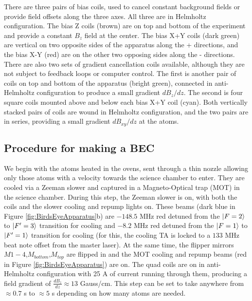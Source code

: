There are three pairs of bias coils, used to cancel constant background fields or provide field offsets along the three axes. All three are in Helmholtz configuration. The bias Z coils (brown) are on top and bottom of the experiment and provide a constant $B_z$ field at the center. The bias X+Y coils (dark green) are vertical on two opposite sides of the apparatus along the \ex{}+\ey{} directions, and the bias X-Y (red) are on the other two opposing sides along the \ex{}-\ey{} directions. There are also two sets of gradient cancellation coils available, although they are not subject to feedback loops or computer control. The first is another pair of coils on top and bottom of the apparatus (bright green), connected in anti-Helmholtz configuration to produce a small gradient $dB_z/dz$. The second is four square coils mounted above and below each bias X+Y coil (cyan). Both vertically stacked pairs of coils are wound in Helmholtz configuration, and the two pairs are in series, providing a small gradient $dB_{xy}/dz$ at the atoms.  


\subsection{Procedure for making a BEC}\label{sec:BECsequence}

We begin with the atoms heated in the ovens, sent through a thin nozzle allowing only those atoms with a velocity towards the science chamber to enter. They are cooled via a Zeeman slower and captured in a Magneto-Optical trap (MOT) in the science chamber. During this step, the Zeeman slower is on, with both the coils and the slower cooling and repump lights on. These beams (dark blue in Figure \ref{fig:BirdsEyeApparatus}b) are $-148.5$ MHz red detuned from the $\mathinner{|{F=2}\rangle}$ to $\mathinner{|{F'=3}\rangle}$ transition for cooling and $-8.2$ MHz red detuned from the $\mathinner{|{F=1}\rangle}$ to $\mathinner{|{F'=1}\rangle}$ transition for cooling (for this, the cooling TA is locked to a $133$ MHz beat note offset from the master laser). At the same time, the flipper mirrors $M1-4$,$M_{bottom}$,$M_{top}$ are flipped in and the MOT cooling and repump beams (red in Figure \ref{fig:BirdsEyeApparatus}) are on. The quad coils are on in anti-Helmholtz configuration with 25 A of current running through them, producing a field gradient of $\frac{dB_z}{dz}\approx13$ Gauss/cm. This step can be set to take anywhere from $\approx0.7$ s to $\approx5$ s depending on how many atoms are needed.  

